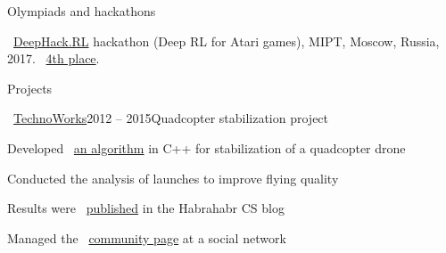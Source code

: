\documentclass{resume} %
\begin{document}

\begin{rSection}{Olympiads and hackathons}
\item \faExternalLink~\href{http://web.archive.org/web/20170224094223/http://rl.deephack.me/}{DeepHack.RL} hackathon (Deep RL for Atari games), MIPT, Moscow, Russia, 2017. \faExternalLink~\href{https://github.com/sergeivolodin/deephack.rl}{4th place}.
\end{rSection}

\begin{rSection}{Projects}
	\begin{rSubsection}{\faExternalLink~\href{http://web.archive.org/web/20150626102512/http://technoworks.ru:80/}{TechnoWorks}}{2012 -- 2015}{Quadcopter stabilization project}{}
		\item Developed \faExternalLink~\href{https://github.com/it-workshop/Quadrocopter}{an algorithm} in C++ for stabilization of a quadcopter drone
		\item Conducted the analysis of launches to improve flying quality
		\item Results were \faExternalLink~\href{http://web.archive.org/web/20141016114551/http://habrahabr.ru/company/technoworks/blog/216437/}{published} in the Habrahabr CS blog
		\item Managed the \faExternalLink~\href{https://vk.com/technoworks}{community page} at a social network
	\end{rSubsection}
\end{rSection}
\end{document}
